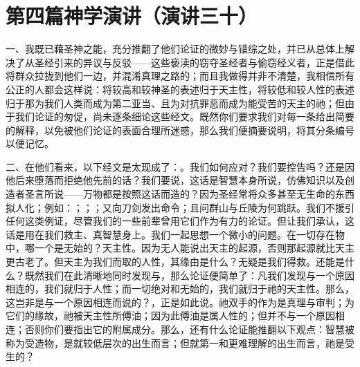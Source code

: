 

\section{第四篇神学演讲（演讲三十）}

\par

一、我既已藉圣神之能，充分推翻了他们论证的微妙与错综之处，并已从总体上解决了从圣经引来的异议与反驳——这些亵渎的窃夺圣经者与偷窃经义者，正是借此将群众拉拢到他们一边，并混淆真理之路的；而且我做得并非不清楚，我相信所有公正的人都会这样说：将较高和较神圣的表述归于天主性，将较低和较人性的表述归于那为我们人类而成为第二亚当、且为对抗罪恶而成为能受苦的天主的祂；但由于我们论证的匆促，尚未逐条细论这些经文。既然你们要求我们对每一条给出简要的解释，以免被他们论证的表面合理所迷惑，那么我们便摘要说明，将其分条编号以便记忆。\par

二、在他们看来，以下经文是太现成了：。我们如何应对？我们要控告吗？还是因他后来堕落而拒绝他先前的话？我们要说，这话是智慧本身所说，仿佛知识以及创造者圣言所说——万物都是按照这话而造的？因为圣经常将众多甚至无生命的东西拟人化；例如：；；；又向刀剑发出命令；且问群山与丘陵为何跳跃。我们不援引任何这类例证，尽管我们的一些前辈曾用它们作为有力的论证。但让我们承认，这话是用在我们救主、真智慧身上。我们一起思想一个微小的问题。在一切存在物中，哪一个是无始的？天主性。因为无人能说出天主的起源，否则那起源就比天主更古老了。但天主为我们而取的人性，其缘由是什么？无疑是我们得救。还能是什么？既然我们在此清晰地同时发现与，那么论证便简单了：凡我们发现与一个原因相连的，我们就归于人性；而一切绝对和无始的，我们就归于祂的天主性。那么，这岂非是与一个原因相连而说的？，正是如此说。祂双手的作为是真理与审判；为它们的缘故，祂被天主性所傅油；因为此傅油是属人性的；但并不与一个原因相连；否则你们要指出它的附属成分。那么，还有什么论证能推翻以下观点：智慧被称为受造物，是就较低层次的出生而言；但就第一和更难理解的出生而言，祂是受生的？\par

